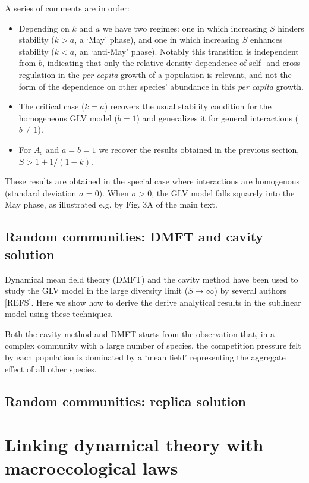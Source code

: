 \documentclass[12pt]{article}
\begin{document}
A series of comments are in order:
\begin{itemize}
    \item Depending on $k$ and $a$ we have two regimes: one in which increasing $S$ hinders stability ($k > a$, a `May' phase), and one in which increasing $S$ enhances stability ($k < a$, an `anti-May' phase). Notably this transition is independent from $b$, indicating that only the relative density dependence of self- and cross-regulation in the \emph{per capita} growth of a population is relevant, and not the form of the dependence on other species' abundance in this \emph{per capita} growth. 
    \item The critical case ($k=a$) recovers the usual stability condition for the homogeneous GLV model ($b=1$) and generalizes it for general interactions ($b\neq 1$).
    \item For $ A_{\textrm{s}}$ and $a = b = 1$ we recover the results obtained in the previous section, $S > 1 + 1/(1-k)$. 
\end{itemize}

These results are obtained in the special case where interactions are homogenous (standard deviation $\sigma = 0$). When $\sigma > 0$, the GLV model falls squarely into the May phase, as illustrated e.g. by Fig. 3A of the main text. 

\subsection{Random communities: DMFT and cavity solution}

Dynamical mean field theory (DMFT) and the cavity method have been used to study the GLV model in the large diversity limit ($S\to\infty$) by several authors [REFS]. Here we show how to derive the derive analytical results in the sublinear model using these techniques.

Both the cavity method and DMFT starts from the observation that, in a complex community with a large number of species, the competition pressure felt by each population is dominated by a `mean field' representing the aggregate effect of all other species. 


\subsection{Random communities: replica solution}

\section{Linking dynamical theory with macroecological laws}
\end{document}

